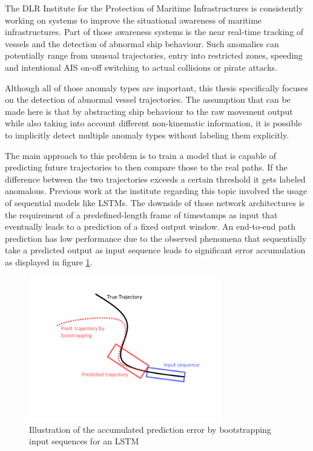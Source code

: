 The DLR Institute for the Protection of Maritime Infrastructures is consistently working on systems to improve the situational awareness of maritime infrastructures. Part of those awareness systems is the near real-time tracking of vessels and the detection of abnormal ship behaviour. Such anomalies can potentially range from unusual trajectories, entry into restricted zones, speeding and intentional AIS on-off switching to actual collisions or pirate attacks.
\par
Although all of those anomaly types are important, this thesis specifically focuses on the detection of abnormal vessel trajectories.  The assumption that can be made here is that by abstracting ship behaviour to the raw movement output while also taking into account different non-kinematic information, it is possible to implicitly detect multiple anomaly types without labeling them explicitly. 
\par
The main approach to this problem is to train a model that is capable of predicting future  trajectories to then compare those to the real paths. If the difference between the two trajectories exceeds a certain threshold it gets labeled anomalous. Previous work at the institute regarding this topic involved the usage of sequential models like LSTMs. The downside of those network architectures is the requirement of a predefined-length frame of timestamps as input that eventually leads to a prediction of a fixed output window. An end-to-end path prediction has low performance due to the observed phenomena that sequentially take a predicted output as input sequence leads to significant error accumulation as displayed in figure \ref{fig:lstm}. 
\begin{figure}[H]
    \centering
    \includegraphics[width=0.75\textwidth]{images/LSTM_trajectory_window_example.png}
    \caption{Illustration of the accumulated prediction error by bootstrapping input sequences for an LSTM}
    \label{fig:lstm}
\end{figure}
